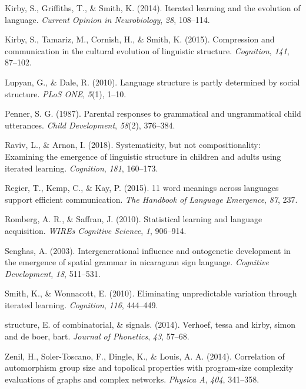\documentclass[10pt, letterpaper]{article}
\begin{document}
\leavevmode\hypertarget{ref-kirby-2014}{}%
Kirby, S., Griffiths, T., \& Smith, K. (2014). Iterated learning and the
evolution of language. \emph{Current Opinion in Neurobiology},
\emph{28}, 108--114.

\leavevmode\hypertarget{ref-kirby-2015}{}%
Kirby, S., Tamariz, M., Cornish, H., \& Smith, K. (2015). Compression
and communication in the cultural evolution of linguistic structure.
\emph{Cognition}, \emph{141}, 87--102.

\leavevmode\hypertarget{ref-lupyan-2010}{}%
Lupyan, G., \& Dale, R. (2010). Language structure is partly determined
by social structure. \emph{PLoS ONE}, \emph{5}(1), 1--10.

\leavevmode\hypertarget{ref-penner-1987}{}%
Penner, S. G. (1987). Parental responses to grammatical and
ungrammatical child utterances. \emph{Child Development}, \emph{58}(2),
376--384.

\leavevmode\hypertarget{ref-raviv-2018}{}%
Raviv, L., \& Arnon, I. (2018). Systematicity, but not compositionality:
Examining the emergence of linguistic structure in children and adults
using iterated learning. \emph{Cognition}, \emph{181}, 160--173.

\leavevmode\hypertarget{ref-regier2015}{}%
Regier, T., Kemp, C., \& Kay, P. (2015). 11 word meanings across
languages support efficient communication. \emph{The Handbook of
Language Emergence}, \emph{87}, 237.

\leavevmode\hypertarget{ref-romberg-2010}{}%
Romberg, A. R., \& Saffran, J. (2010). Statistical learning and language
acquisition. \emph{WIREs Cognitive Science}, \emph{1}, 906--914.

\leavevmode\hypertarget{ref-senghas-2003}{}%
Senghas, A. (2003). Intergenerational influence and ontogenetic
development in the emergence of spatial grammar in nicaraguan sign
language. \emph{Cognitive Development}, \emph{18}, 511--531.

\leavevmode\hypertarget{ref-smith-2010}{}%
Smith, K., \& Wonnacott, E. (2010). Eliminating unpredictable variation
through iterated learning. \emph{Cognition}, \emph{116}, 444--449.

\leavevmode\hypertarget{ref-verhoef-2014}{}%
structure, E. of combinatorial, \& signals. (2014). Verhoef, tessa and
kirby, simon and de boer, bart. \emph{Journal of Phonetics}, \emph{43},
57--68.

\leavevmode\hypertarget{ref-zenil-2014}{}%
Zenil, H., Soler-Toscano, F., Dingle, K., \& Louis, A. A. (2014).
Correlation of automorphism group size and topolical properties with
program-size complexity evaluations of graphs and complex networks.
\emph{Physica A}, \emph{404}, 341--358.


\end{document}
